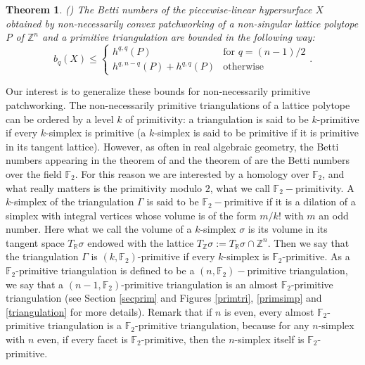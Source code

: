 \documentclass{article}
\newtheorem{theorem}{Theorem}
\begin{document}
\begin{theorem}
    (\cite{BMR 2024}) The Betti numbers of the piecewise-linear hypersurface $X$ obtained by non-necessarily convex patchworking of a non-singular lattice polytope P of $\mathbb{Z}^n$ and a primitive triangulation are bounded in the following way:
    \begin{equation*}
        b_q(X) \leq \left \{ \begin{array}{ll}
            h^{q,q}(P) & \text{for } q = (n-1)/2 \\
            h^{q,n-q}(P) + h^{q,q}(P) & \text{otherwise} 
        \end{array} \right. .
    \end{equation*}
    \label{BMRt}
\end{theorem}

Our interest is to generalize these bounds for non-necessarily primitive patchworking. The non-necessarily primitive triangulations of a lattice polytope can be ordered by a level $k$ of primitivity: a triangulation is said to be $k$-primitive if every $k$-simplex is primitive (a $k$-simplex is said to be primitive if it is primitive in its tangent lattice). However, as often in real algebraic geometry, the Betti numbers appearing in the theorem of \cite{RS 2023} and the theorem of \cite{BMR 2024} are the Betti numbers over the field $\mathbb{F}_2$. For this reason we are interested by a homology over $\mathbb{F}_2$, and what really matters is the primitivity modulo $2$, what we call $\mathbb{F}_2-$primitivity. A $k$-simplex of the triangulation $\Gamma$ is said to be $\mathbb{F}_2-$primitive if it is a dilation of a simplex with integral vertices whose volume is of the form $m/k!$ with $m$ an odd number. Here what we call the volume of a $k$-simplex $\sigma$ is its volume in its tangent space $T_{\mathbb{R}}\sigma$ endowed with the lattice $T_{\mathbb{Z}}\sigma:=T_{\mathbb{R}}\sigma\cap\mathbb{Z}^n$. Then we say that the triangulation $\Gamma$ is $(k,\mathbb{F}_2)$-primitive if every $k$-simplex is $\mathbb{F}_2$-primitive. As a $\mathbb{F}_2$-primitive triangulation is defined to be a $(n,\mathbb{F}_2)-$primitive triangulation, we say that a $(n-1,\mathbb{F}_2)$-primitive triangulation is an almost $\mathbb{F}_2$-primitive triangulation (see Section \ref{secprim} and Figures \ref{primtri}, \ref{primsimp} and \ref{triangulation} for more details). Remark that if $n$ is even, every almost $\mathbb{F}_2$-primitive triangulation is a $\mathbb{F}_2$-primitive triangulation, because for any $n$-simplex with $n$ even, if every facet is $\mathbb{F}_2$-primitive, then the $n$-simplex itself is $\mathbb{F}_2$-primitive.
\end{document}
